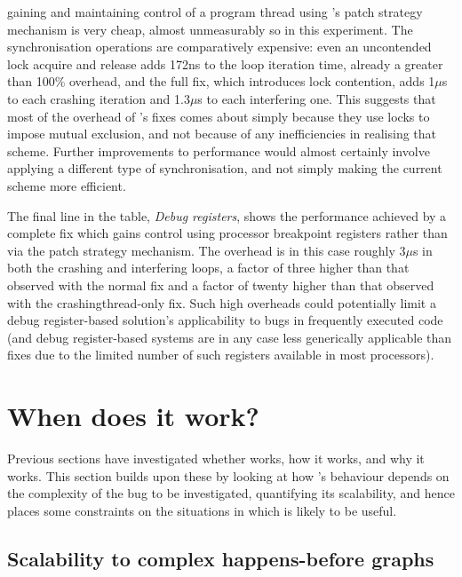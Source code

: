 gaining and maintaining control of a program thread using
{\technique}'s patch strategy mechanism is very cheap, almost
unmeasurably so in this experiment.  The synchronisation operations
are comparatively expensive: even an uncontended lock acquire and
release adds 172ns to the loop iteration time, already a greater than
100\% overhead, and the full fix, which introduces lock contention,
adds 1$\mu$s to each crashing iteration and 1.3$\mu$s to each
interfering one.  This suggests that most of the overhead of
{\implementation}'s fixes comes about simply because they use locks to
impose mutual exclusion, and not because of any inefficiencies in
realising that scheme.  Further improvements to performance would
almost certainly involve applying a different type of synchronisation,
and not simply making the current scheme more efficient.

The final line in the table, \textit{Debug registers}, shows the
performance achieved by a complete fix which gains control using
processor breakpoint registers rather than via the patch strategy
mechanism.  The overhead is in this case roughly 3$\mu$s in both the
crashing and interfering loops, a factor of three higher than that
observed with the normal {\implementation} fix and a factor of twenty
higher than that observed with the \gls{crashingthread}-only
{\implementation} fix.  Such high overheads could potentially limit a debug
register-based solution's applicability to bugs in frequently executed
code (and debug register-based systems are in any case less
generically applicable than {\implementation} fixes due to the limited
number of such registers available in most processors).

\section{When does it work?}
\label{sect:eval:does_it_scale}

Previous sections have investigated whether {\implementation} works,
how it works, and why it works.  This section builds upon these by
looking at how {\implementation}'s behaviour depends on the complexity
of the bug to be investigated, quantifying its scalability, and hence
places some constraints on the situations in which {\technique} is
likely to be useful.

\subsection{Scalability to complex happens-before graphs}
\label{sect:eval:complex_hb}

